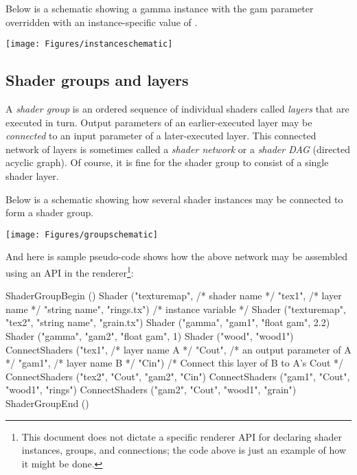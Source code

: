 \documentclass[11pt,letterpaper]{book}
\begin{document}
Below is a
schematic showing a {\cf gamma} instance with the {\cf gam} parameter
overridden with an instance-specific value of {}.

\bigskip

\bigspc\spc \texttt{[image: Figures/instanceschematic]}

\medskip



\subsection*{Shader groups and layers}

A \emph{shader group} is an ordered sequence of individual shaders
called \emph{layers} that are executed in turn.  Output parameters of an
earlier-executed layer may be \emph{connected} to an input parameter of
a later-executed layer.  This connected network of layers is sometimes
called a \emph{shader network} or a \emph{shader DAG} (directed acyclic
graph).  Of course, it is fine for the shader group to consist of a
single shader layer.

Below is a schematic showing how several shader instances may be
connected to form a shader group.

\bigskip

\noindent \texttt{[image: Figures/groupschematic]}

\bigskip

\noindent And here is sample pseudo-code shows how the above network may
be assembled using an API in the renderer\footnote{This document does
not dictate a specific renderer API for declaring shader instances,
groups, and connections; the code above is just an example of how
it might be done.}:

\begin{code}
    ShaderGroupBegin ()
    Shader ("texturemap",               /* shader name */
            "tex1",                     /* layer name */
            "string name", "rings.tx")  /* instance variable */
    Shader ("texturemap", "tex2", "string name", "grain.tx")
    Shader ("gamma", "gam1", "float gam", 2.2)
    Shader ("gamma", "gam2", "float gam", 1)
    Shader ("wood", "wood1")
    ConnectShaders ("tex1",     /* layer name A */
                    "Cout",     /* an output parameter of A */
                    "gam1",     /* layer name B */
                    "Cin")      /* Connect this layer of B to A's Cout */
    ConnectShaders ("tex2", "Cout", "gam2", "Cin")
    ConnectShaders ("gam1", "Cout", "wood1", "rings")
    ConnectShaders ("gam2", "Cout", "wood1", "grain")
    ShaderGroupEnd ()
\end{code}
\end{document}
